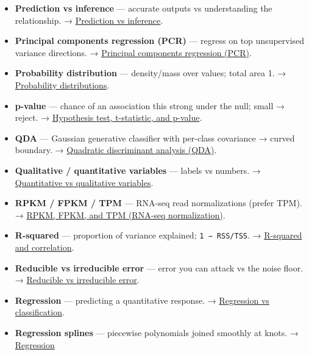 \documentclass[
  10pt,
  letterpaper,
  onecolumn]{article}
\begin{document}
\begin{itemize}
  \textbf{Power (statistical)} --- 1 − β, the chance of detecting a true
  effect. →
  \protect\hyperlink{statistical-power-and-power-analysis}{Statistical
  power and power analysis}.
\item
  \textbf{Prediction vs inference} --- accurate outputs vs understanding
  the relationship. →
  \protect\hyperlink{prediction-vs-inference}{Prediction vs inference}.
\item
  \textbf{Principal components regression (PCR)} --- regress on top
  unsupervised variance directions. →
  \protect\hyperlink{principal-components-regression-pcr}{Principal
  components regression (PCR)}.
\item
  \textbf{Probability distribution} --- density/mass over values; total
  area 1. → \protect\hyperlink{probability-distributions}{Probability
  distributions}.
\item
  \textbf{p-value} --- chance of an association this strong under the
  null; small → reject. →
  \protect\hyperlink{hypothesis-test-t-statistic-and-p-value}{Hypothesis
  test, t-statistic, and p-value}.
\item
  \textbf{QDA} --- Gaussian generative classifier with per-class
  covariance → curved boundary. →
  \protect\hyperlink{quadratic-discriminant-analysis-qda}{Quadratic
  discriminant analysis (QDA)}.
\item
  \textbf{Qualitative / quantitative variables} --- labels vs numbers. →
  \protect\hyperlink{quantitative-vs-qualitative-variables}{Quantitative
  vs qualitative variables}.
\item
  \textbf{RPKM / FPKM / TPM} --- RNA-seq read normalizations (prefer
  TPM). →
  \protect\hyperlink{rpkm-fpkm-and-tpm-rna-seq-normalization}{RPKM,
  FPKM, and TPM (RNA-seq normalization)}.
\item
  \textbf{R-squared} --- proportion of variance explained;
  \texttt{1\ −\ RSS/TSS}. →
  \protect\hyperlink{r-squared-and-correlation}{R-squared and
  correlation}.
\item
  \textbf{Reducible vs irreducible error} --- error you can attack vs
  the noise floor. →
  \protect\hyperlink{reducible-vs-irreducible-error}{Reducible vs
  irreducible error}.
\item
  \textbf{Regression} --- predicting a quantitative response. →
  \protect\hyperlink{regression-vs-classification}{Regression vs
  classification}.
\item
  \textbf{Regression splines} --- piecewise polynomials joined smoothly
  at knots. → \protect\hyperlink{regression-splines}{Regression
}
\end{itemize}
\end{document}
